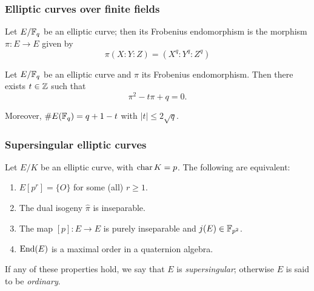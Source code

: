 \documentclass{beamer}
\begin{document}
    \begin{frame}
        \frametitle{Elliptic curves over finite fields}
        
        \begin{definition}
            Let $E/\mathbb{F}_q$ be an elliptic curve; then its Frobenius endomorphism is the morphism $\pi: E\to E$ given by $$\pi(X:Y:Z)=(X^q:Y^q:Z^q)$$
        \end{definition}
    
        \begin{theorem}
            Let $E/\mathbb{F}_q$ be an elliptic curve and $\pi$ its Frobenius endomorphism. Then there exists $t\in\mathbb{Z}$ such that $$\pi^2-t\pi+q=0.$$
            
            Moreover, $\# E(\mathbb{F}_q) = q+1-t$ with $|t|\le2\sqrt q$.
        \end{theorem}
    \end{frame}

    \begin{frame}
        \frametitle{Supersingular elliptic curves}
        
        \begin{theorem}
            Let $E/K$ be an elliptic curve, with $\operatorname{char} K=p$. The following are equivalent:
            \begin{enumerate}
                \item $E[p^r]=\{O\}$ for some (all) $r\ge1$.
                \item The dual isogeny $\hat\pi$ is inseparable.
                \item The map $[p]:E\to E$ is purely inseparable and $j(E)\in\mathbb{F}_{p^2}$.
                \item $\operatorname{End}(E)$ is a maximal order in a quaternion algebra.
            \end{enumerate}
            If any of these properties hold, we say that $E$ is \emph{supersingular}; otherwise $E$ is said to be \emph{ordinary}.
        \end{theorem}
    \end{frame}
\end{document}
